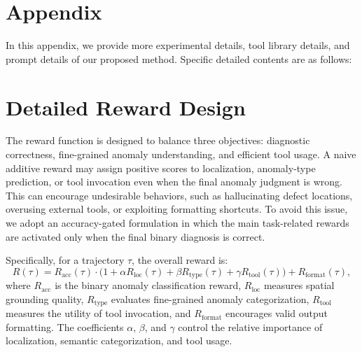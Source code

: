 \documentclass{article}
\begin{document}


{
\small

 



\newpage

\appendix
\section*{Appendix}

\label{app:discussion}
In this appendix, we provide more experimental details, tool library details, and prompt details of our proposed method.
Specific detailed contents are as follows:

\setlength{\cftbeforesecskip}{0.5em}
{
  \etocsettocstyle{}{}
  \localtableofcontents
}

\section{Detailed Reward Design}
\label{appx:reward_design}

The reward function is designed to balance three objectives: diagnostic correctness, fine-grained anomaly understanding, and efficient tool usage. 
A naive additive reward may assign positive scores to localization, anomaly-type prediction, or tool invocation even when the final anomaly judgment is wrong. 
This can encourage undesirable behaviors, such as hallucinating defect locations, overusing external tools, or exploiting formatting shortcuts. 
To avoid this issue, we adopt an accuracy-gated formulation in which the main task-related rewards are activated only when the final binary diagnosis is correct.

Specifically, for a trajectory $\tau$, the overall reward is:
\begin{equation}
R(\tau) =
R_{\text{acc}}(\tau)
\cdot
\Big(
1 + \alpha R_{\text{loc}}(\tau)
+ \beta R_{\text{type}}(\tau)
+ \gamma R_{\text{tool}}(\tau)
\Big)
+
R_{\text{format}}(\tau),
\end{equation}
where $R_{\text{acc}}$ is the binary anomaly classification reward, $R_{\text{loc}}$ measures spatial grounding quality, $R_{\text{type}}$ evaluates fine-grained anomaly categorization, $R_{\text{tool}}$ measures the utility of tool invocation, and $R_{\text{format}}$ encourages valid output formatting. 
The coefficients $\alpha$, $\beta$, and $\gamma$ control the relative importance of localization, semantic categorization, and tool usage.

}
\end{document}
